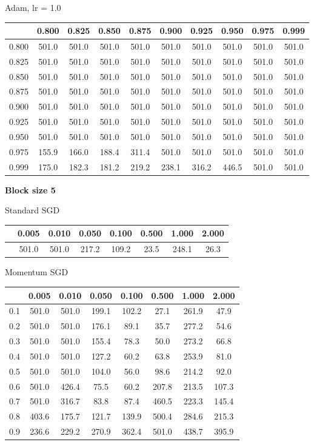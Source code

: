 \documentclass[a4paper,14pt,oneside,openany]{memoir}
\begin{document}
	Adam, lr = 1.0 
	
	\begin{tabular}{|c|c|c|c|c|c|c|c|c|c|}
	\hline 
	 &0.800 &0.825 &0.850 &0.875 &0.900 &0.925 &0.950 &0.975 &0.999 \\
	 \hline 
	0.800 &501.0 &501.0 &501.0 &501.0 &501.0 &501.0 &501.0 &501.0 &501.0 \\
	 \hline 
	0.825 &501.0 &501.0 &501.0 &501.0 &501.0 &501.0 &501.0 &501.0 &501.0 \\
	 \hline 
	0.850 &501.0 &501.0 &501.0 &501.0 &501.0 &501.0 &501.0 &501.0 &501.0 \\
	 \hline 
	0.875 &501.0 &501.0 &501.0 &501.0 &501.0 &501.0 &501.0 &501.0 &501.0 \\
	 \hline 
	0.900 &501.0 &501.0 &501.0 &501.0 &501.0 &501.0 &501.0 &501.0 &501.0 \\
	 \hline 
	0.925 &501.0 &501.0 &501.0 &501.0 &501.0 &501.0 &501.0 &501.0 &501.0 \\
	 \hline 
	0.950 &501.0 &501.0 &501.0 &501.0 &501.0 &501.0 &501.0 &501.0 &501.0 \\
	 \hline 
	0.975 &155.9 &166.0 &188.4 &311.4 &501.0 &501.0 &501.0 &501.0 &501.0 \\
	 \hline 
	0.999 &175.0 &182.3 &181.2 &219.2 &238.1 &316.2 &446.5 &501.0 &501.0 \\
	 \hline 
	
	\end{tabular}
	
	\textbf{Block size 5}
	
	Standard SGD 
	
	\begin{tabular}{|c|c|c|c|c|c|c|c|}
	\hline 
	 &0.005 &0.010 &0.050 &0.100 &0.500 &1.000 &2.000 \\
	 \hline 
	 &501.0 &501.0 &217.2 &109.2 &23.5 &248.1 &26.3 \\
	 \hline 
	
	\end{tabular}
	
	Momentum SGD 
	
	\begin{tabular}{|c|c|c|c|c|c|c|c|}
	\hline 
	 &0.005 &0.010 &0.050 &0.100 &0.500 &1.000 &2.000 \\
	 \hline 
	0.1 &501.0 &501.0 &199.1 &102.2 &27.1 &261.9 &47.9 \\
	 \hline 
	0.2 &501.0 &501.0 &176.1 &89.1 &35.7 &277.2 &54.6 \\
	 \hline 
	0.3 &501.0 &501.0 &155.4 &78.3 &50.0 &273.2 &66.8 \\
	 \hline 
	0.4 &501.0 &501.0 &127.2 &60.2 &63.8 &253.9 &81.0 \\
	 \hline 
	0.5 &501.0 &501.0 &104.0 &56.0 &98.6 &214.2 &92.0 \\
	 \hline 
	0.6 &501.0 &426.4 &75.5 &60.2 &207.8 &213.5 &107.3 \\
	 \hline 
	0.7 &501.0 &316.7 &83.8 &87.4 &460.5 &223.3 &145.4 \\
	 \hline 
	0.8 &403.6 &175.7 &121.7 &139.9 &500.4 &284.6 &215.3 \\
	 \hline 
	0.9 &236.6 &229.2 &270.9 &362.4 &501.0 &438.7 &395.9 \\
	 \hline 
	
	\end{tabular}
	
\end{document}
